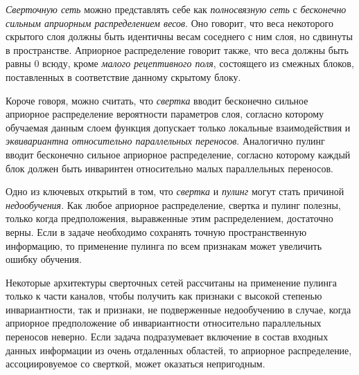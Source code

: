 \documentclass[%
	11pt,
	a4paper,
	utf8,
]{article}
\begin{document}
\emph{Сверточную сеть} можно представлять себе как \emph{полносвязную сеть} с \emph{бесконечно сильным априорным распределением весов}. Оно говорит, что веса некоторого скрытого слоя должны быть идентичны весам соседнего с ним слоя, но сдвинуты в пространстве. Априорное распределение говорит также, что веса должны быть равны 0 всюду, кроме \emph{малого рецептивного поля}, состоящего из смежных блоков, поставленных в соответствие данному скрытому блоку.

Короче говоря, можно считать, что \emph{свертка} вводит бесконечно сильное априорное распределение вероятности параметров слоя, согласно которому обучаемая данным слоем функция допускает только локальные взаимодействия и \emph{эквивариантна относительно параллельных переносов}. Аналогично пулинг вводит бесконечно сильное априорное распределение, согласно которому каждый блок должен быть инваринтен относительно малых параллельных переносов.

Одно из ключевых открытий в том, что \emph{свертка} и \emph{пулинг} могут стать причиной \emph{недообучения}. Как любое априорное распределение, свертка и пулинг полезны, только когда предположения, выравженные этим распределением, достаточно верны. Если в задаче необходимо сохранять точную пространственную информацию, то применение пулинга по всем признакам может увеличить ошибку обучения.

Некоторые архитектуры сверточных сетей рассчитаны на применение пулинга только к части каналов, чтобы получить как признаки с высокой степенью инвариантности, так и признаки, не подверженные недообучению в случае, когда априорное предположение об инвариантности относительно параллельных переносов неверно. Если задача подразумевает включение в состав входных данных информации из очень отдаленных областей, то априорное распределение, ассоциировуемое со сверткой, может оказаться непригодным.









\begin{thebibliography}{99}
	
\end{thebibliography}


\end{document}
